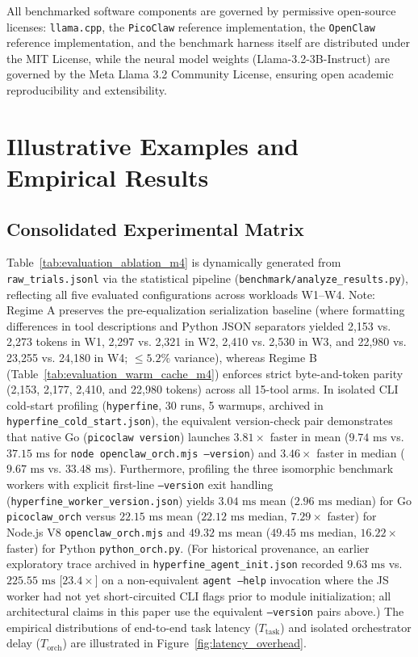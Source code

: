 \documentclass[11pt,a4paper]{article}
\begin{document}
All benchmarked software components are governed by permissive open-source licenses: \texttt{llama.cpp}, the \texttt{PicoClaw} reference implementation, the \texttt{OpenClaw} reference implementation, and the benchmark harness itself are distributed under the MIT License, while the neural model weights (Llama-3.2-3B-Instruct) are governed by the Meta Llama 3.2 Community License, ensuring open academic reproducibility and extensibility.

\section{Illustrative Examples and Empirical Results}
\label{sec:examples}



\subsection{Consolidated Experimental Matrix}
Table~\ref{tab:evaluation_ablation_m4} is dynamically generated from \texttt{raw\_trials.jsonl} via the statistical pipeline (\texttt{benchmark/analyze\_results.py}), reflecting all five evaluated configurations across workloads W1--W4. Note: Regime A preserves the pre-equalization serialization baseline (where formatting differences in tool descriptions and Python JSON separators yielded 2,153 vs. 2,273 tokens in W1, 2,297 vs. 2,321 in W2, 2,410 vs. 2,530 in W3, and 22,980 vs. 23,255 vs. 24,180 in W4; $\le 5.2\%$ variance), whereas Regime B (Table~\ref{tab:evaluation_warm_cache_m4}) enforces strict byte-and-token parity (2,153, 2,177, 2,410, and 22,980 tokens) across all 15-tool arms. In isolated CLI cold-start profiling (\texttt{hyperfine}, 30 runs, 5 warmups, archived in \texttt{hyperfine\_cold\_start.json}), the equivalent version-check pair demonstrates that native Go (\texttt{picoclaw version}) launches $3.81\times$ faster in mean ($9.74\text{ ms}$ vs. $37.15\text{ ms}$ for \texttt{node openclaw\_orch.mjs --version}) and $3.46\times$ faster in median ($9.67\text{ ms}$ vs. $33.48\text{ ms}$). Furthermore, profiling the three isomorphic benchmark workers with explicit first-line \texttt{--version} exit handling (\texttt{hyperfine\_worker\_version.json}) yields $3.04\text{ ms}$ mean ($2.96\text{ ms}$ median) for Go \texttt{picoclaw\_orch} versus $22.15\text{ ms}$ mean ($22.12\text{ ms}$ median, $7.29\times$ faster) for Node.js V8 \texttt{openclaw\_orch.mjs} and $49.32\text{ ms}$ mean ($49.45\text{ ms}$ median, $16.22\times$ faster) for Python \texttt{python\_orch.py}. (For historical provenance, an earlier exploratory trace archived in \texttt{hyperfine\_agent\_init.json} recorded $9.63\text{ ms}$ vs. $225.55\text{ ms}$ [$23.4\times$] on a non-equivalent \texttt{agent --help} invocation where the JS worker had not yet short-circuited CLI flags prior to module initialization; all architectural claims in this paper use the equivalent \texttt{--version} pairs above.) The empirical distributions of end-to-end task latency ($T_{\text{task}}$) and isolated orchestrator delay ($T_{\text{orch}}$) are illustrated in Figure~\ref{fig:latency_overhead}.
\end{document}
